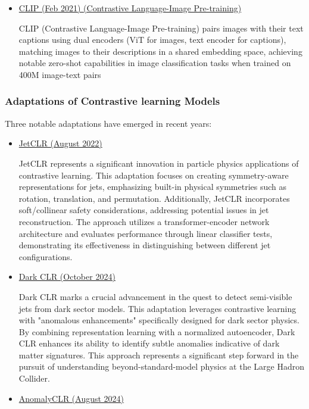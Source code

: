 \documentclass[letterpaper,12pt]{article}
\begin{document}
\begin{spacing}{1.125}
\begin{itemize}
\item \href{https://arxiv.org/abs/2103.00020}{CLIP (Feb 2021) (Contrastive Language-Image Pre-training)}

CLIP (Contrastive Language-Image Pre-training) pairs images with their text captions using dual
encoders (ViT for images, text encoder for captions), matching images to their descriptions in a
shared embedding space, achieving notable zero-shot capabilities in image classification tasks
when trained on 400M image-text pairs
\end{itemize}


\subsubsection{Adaptations of Contrastive learning Models}
Three notable adaptations have emerged in recent years:
\begin{itemize}
  \item \href{https://arxiv.org/abs/2108.04253}{JetCLR (August 2022)}

JetCLR represents a significant innovation in particle physics applications of contrastive learning. This adaptation focuses on creating symmetry-aware representations for jets, emphasizing built-in physical symmetries such as rotation, translation, and permutation. Additionally, JetCLR incorporates soft/collinear safety considerations, addressing potential issues in jet reconstruction. The approach utilizes a transformer-encoder network architecture and evaluates performance through linear classifier tests, demonstrating its effectiveness in distinguishing between different jet configurations.

\item \href{https://arxiv.org/abs/2312.03067}{Dark CLR (October 2024)}

Dark CLR marks a crucial advancement in the quest to detect semi-visible jets from dark sector models. This adaptation leverages contrastive learning with "anomalous enhancements" specifically designed for dark sector physics. By combining representation learning with a normalized autoencoder, Dark CLR enhances its ability to identify subtle anomalies indicative of dark matter signatures. This approach represents a significant step forward in the pursuit of understanding beyond-standard-model physics at the Large Hadron Collider.

\item \href{https://arxiv.org/pdf/2301.04660}{AnomalyCLR (August 2024)}


\end{itemize}
\end{spacing}
\end{document}
